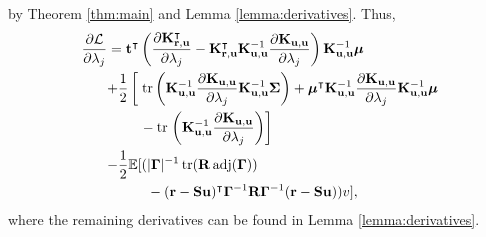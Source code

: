 \documentclass{mpaper}
\DeclareMathOperator{\adj}{adj}
\DeclareMathOperator{\tr}{tr}
\newcommand{\Kuu}{\mathbf{K}_{\mathbf{u},\mathbf{u}}}
\newcommand{\Kru}{\mathbf{K}_{\mathbf{r},\mathbf{u}}}
\begin{document}
by Theorem \ref{thm:main} and Lemma \ref{lemma:derivatives}. Thus,
\begin{align*}
  \frac{\partial \mathcal{L}}{\partial \lambda_j} &=
  \mathbf{t}^\intercal \left( \frac{\partial \Kru^\intercal}{\partial
      \lambda_j} - \Kru^\intercal\Kuu^{-1}\frac{\partial
      \Kuu}{\partial \lambda_j} \right) \Kuu^{-1} \bm\mu \\
  &\begin{aligned}
    + \frac{1}{2} \left[ \vphantom{\frac{\partial \Kuu}{\partial \lambda_j}}
    \right. &\tr \left( \Kuu^{-1} \frac{\partial \Kuu}{\partial \lambda_j}
      \Kuu^{-1} \bm\Sigma \right) + \bm\mu^\intercal \Kuu^{-1} \frac{\partial
      \Kuu}{\partial \lambda_j} \Kuu^{-1} \bm\mu \\
    &- \tr \left. \left(\Kuu^{-1} \frac{\partial \Kuu}{\partial \lambda_j}
      \right) \right]
  \end{aligned} \\
  &\begin{aligned}
    - \frac{1}{2} \mathbb{E} [ (&|\bm\Gamma|^{-1} \tr(\mathbf{R} \adj(\bm\Gamma)) \\
    &- (\mathbf{r} - \mathbf{Su})^\intercal\bm\Gamma^{-1}\mathbf{R}\bm\Gamma^{-1}(\mathbf{r} - \mathbf{Su})) v],
  \end{aligned} 
\end{align*}
where the remaining derivatives can be found in Lemma \ref{lemma:derivatives}.
\end{document}
